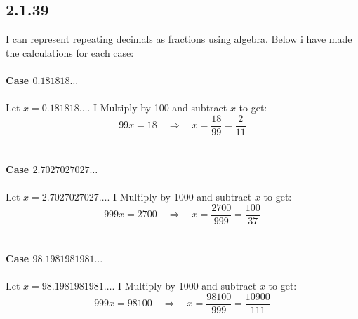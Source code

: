 \documentclass{article}
\begin{document}
\subsection*{2.1.39}
I can represent repeating decimals as fractions using algebra. Below i have made the calculations for each case:
\\
\\
\textbf{Case \(0.181818 \ldots\)}
\\
\\
Let \( x = 0.181818 \ldots \).  I Multiply by 100 and subtract \( x \) to get:
\[
99x = 18 \quad \Rightarrow \quad x = \frac{18}{99} = \frac{2}{11}
\]
\\
\\
\textbf{Case \(2.7027027027 \ldots\)}
\\
\\
Let \( x = 2.7027027027 \ldots \). I Multiply by 1000 and subtract \( x \) to get:
\[
999x = 2700 \quad \Rightarrow \quad x = \frac{2700}{999} = \frac{100}{37}
\]
\\
\\
\textbf{Case \(98.1981981981 \ldots\)}
\\
\\
Let \( x = 98.1981981981 \ldots \). I Multiply by 1000 and subtract \( x \) to get:
\[
999x = 98100 \quad \Rightarrow \quad x = \frac{98100}{999} = \frac{10900}{111}
\]
\end{document}
